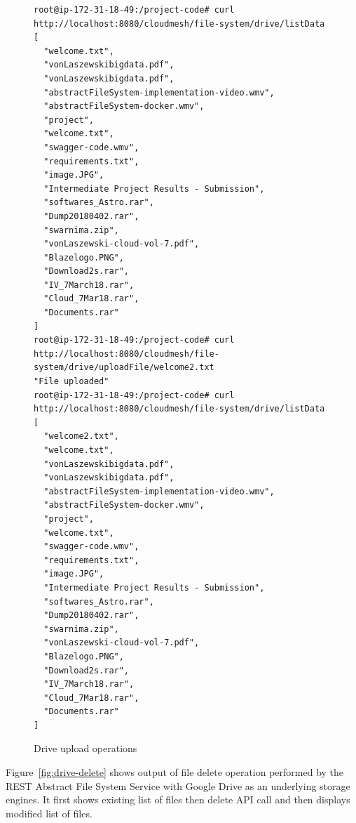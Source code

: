 \begin{figure}[!ht]
\begin{footnotesize}
\begin{verbatim}
root@ip-172-31-18-49:/project-code# curl http://localhost:8080/cloudmesh/file-system/drive/listData
[
  "welcome.txt",
  "vonLaszewskibigdata.pdf",
  "vonLaszewskibigdata.pdf",
  "abstractFileSystem-implementation-video.wmv",
  "abstractFileSystem-docker.wmv",
  "project",
  "welcome.txt",
  "swagger-code.wmv",
  "requirements.txt",
  "image.JPG",
  "Intermediate Project Results - Submission",
  "softwares_Astro.rar",
  "Dump20180402.rar",
  "swarnima.zip",
  "vonLaszewski-cloud-vol-7.pdf",
  "Blazelogo.PNG",
  "Download2s.rar",
  "IV_7March18.rar",
  "Cloud_7Mar18.rar",
  "Documents.rar"
]
root@ip-172-31-18-49:/project-code# curl http://localhost:8080/cloudmesh/file-system/drive/uploadFile/welcome2.txt
"File uploaded"
root@ip-172-31-18-49:/project-code# curl http://localhost:8080/cloudmesh/file-system/drive/listData
[
  "welcome2.txt",
  "welcome.txt",
  "vonLaszewskibigdata.pdf",
  "vonLaszewskibigdata.pdf",
  "abstractFileSystem-implementation-video.wmv",
  "abstractFileSystem-docker.wmv",
  "project",
  "welcome.txt",
  "swagger-code.wmv",
  "requirements.txt",
  "image.JPG",
  "Intermediate Project Results - Submission",
  "softwares_Astro.rar",
  "Dump20180402.rar",
  "swarnima.zip",
  "vonLaszewski-cloud-vol-7.pdf",
  "Blazelogo.PNG",
  "Download2s.rar",
  "IV_7March18.rar",
  "Cloud_7Mar18.rar",
  "Documents.rar"
]
\end{verbatim}
\end{footnotesize}
\caption{Drive upload operations}\label{fig:drive-upload}
\end{figure}


Figure~\ref{fig:drive-delete} shows output of file delete operation
performed by the REST Abstract File System Service with Google Drive
as an underlying storage engines.
It first shows existing list of files then delete API call and then 
displays modified list of files.

